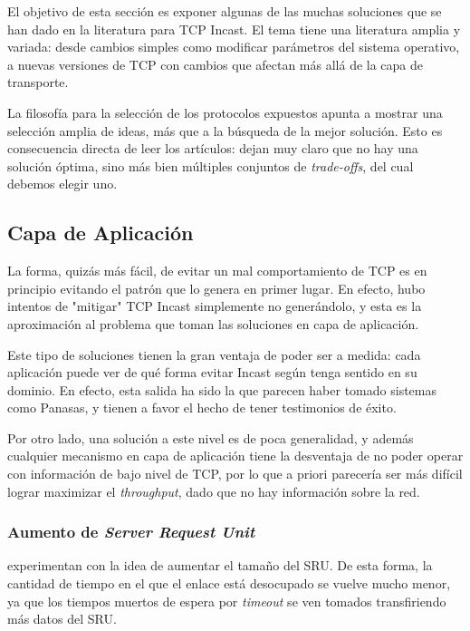 \documentclass[runningheads,a4paper]{llncs}
\begin{document}
El objetivo de esta sección es exponer algunas de las muchas soluciones que se han dado en la literatura para TCP Incast. El tema tiene una literatura amplia y variada: desde cambios simples como modificar parámetros del sistema operativo, a nuevas versiones de TCP con cambios que afectan más allá de la capa de transporte.

La filosofía para la selección de los protocolos expuestos apunta a mostrar una selección amplia de ideas, más que a la búsqueda de la mejor solución. Esto es consecuencia directa de leer los artículos: dejan muy claro que no hay una solución óptima, sino más bien múltiples conjuntos de \textit{trade-offs}, del cual debemos elegir uno.

\subsection{Capa de Aplicación}

La forma, quizás más fácil, de evitar un mal comportamiento de TCP es en principio evitando el patrón que lo genera en primer lugar. En efecto, hubo intentos de "mitigar" TCP Incast simplemente no generándolo, y esta es la aproximación al problema que toman las soluciones en capa de aplicación.

Este tipo de soluciones tienen la gran ventaja de poder ser a medida: cada aplicación puede ver de qué forma evitar Incast según tenga sentido en su dominio. En efecto, esta salida ha sido la que parecen haber tomado sistemas como Panasas, y tienen a favor el hecho de tener testimonios de éxito.

Por otro lado, una solución a este nivel es de poca generalidad, y además cualquier mecanismo en capa de aplicación tiene la desventaja de no poder operar con información de bajo nivel de TCP, por lo que a priori parecería ser más difícil lograr maximizar el \textit{throughput}, dado que no hay información sobre la red.

\subsubsection{Aumento de \textit{Server Request Unit}}

\citet{Phanishayee_Throughput_2008} experimentan con la idea de aumentar el tamaño del SRU. De esta forma, la cantidad de tiempo en el que el enlace está desocupado se vuelve mucho menor, ya que los tiempos muertos de espera por \textit{timeout} se ven tomados transfiriendo más datos del SRU.
\end{document}
